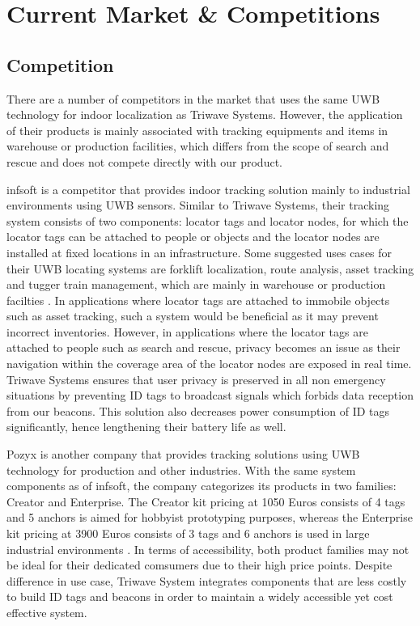 

\setcounter{section}{2}
\section{Current Market \& Competitions}
\bigskip



\subsection{Competition}
\medskip
There are a number of competitors in the market that uses the same UWB technology for indoor localization as Triwave Systems. However, the application of their products is mainly associated with tracking equipments and items in warehouse or production facilities, which differs from the scope of search and rescue and does not compete directly with our product. 

\bigskip
infsoft is a competitor that provides indoor tracking solution mainly to industrial environments using UWB sensors. Similar to Triwave Systems, their tracking system consists of two components: locator tags and locator nodes, for which the locator tags can be attached to people or objects and the locator nodes are installed at fixed locations in an infrastructure. Some suggested uses cases for their UWB locating systems are forklift localization, route analysis, asset tracking and tugger train management, which are mainly in warehouse or production facilties \cite{R3-1}. In applications where locator tags are attached to immobile objects such as asset tracking, such a system would be beneficial as it may prevent incorrect inventories. However, in applications where the locator tags are attached to people such as search and rescue, privacy becomes an issue as their navigation within the coverage area of the locator nodes are exposed in real time. Triwave Systems ensures that user privacy is preserved in all non emergency situations by preventing ID tags to broadcast signals which forbids data reception from our beacons. This solution also decreases power consumption of ID tags significantly, hence lengthening their battery life as well. 

\bigskip
Pozyx is another company that provides tracking solutions using UWB technology for production and other industries. With the same system components as of infsoft, the company categorizes its products in two families: Creator and Enterprise. The Creator kit pricing at 1050 Euros consists of 4 tags and 5 anchors is aimed for hobbyist prototyping purposes, whereas the Enterprise kit pricing at 3900 Euros consists of 3 tags and 6 anchors is used in large industrial environments \cite{R3-2}. In terms of accessibility, both product families may not be ideal for their dedicated comsumers due to their high price points. Despite difference in use case, Triwave System integrates components that are less costly to build ID tags and beacons in order to maintain a widely accessible yet cost effective system. 

